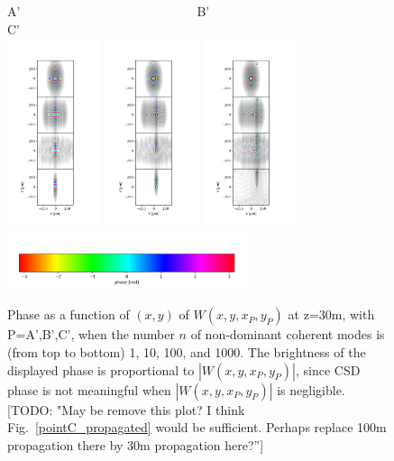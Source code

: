 \documentclass{iucr}              %
\newcommand{\todo}[1]{{\color{red}[TODO: "#1'']}}
\begin{document}
\begin{figure}
\caption{Phase as a function of $(x,y)$ of $W(x,y,x_P,y_P)$ at z=30m, with P=A',B',C', when the number $n$ of non-dominant coherent modes is (from top to bottom) 1, 10, 100, and 1000. The brightness of the displayed phase is proportional to $|W(x,y,x_P,y_P)|$, since CSD phase is not meaningful when $|W(x,y,x_P,y_P)|$ is negligible. \todo{May be remove this plot? I think Fig.~\ref{pointC_propagated} would be sufficient. Perhaps replace 100m propagation there by 30m propagation here?} }
A'~~~~~~~~~~~~~~~~~~~~~~~~~~~~B'~~~~~~~~~~~~~~~~~~~~~~~~~~~~C'\\
\includegraphics[width=2.75cm]{Figures/vx_id16a_A_propagated.png}
\includegraphics[width=2.75cm]{Figures/vx_id16a_B_propagated.png}
\includegraphics[width=2.75cm]{Figures/vx_id16a_C_propagated.png}
\includegraphics[width=7cm]{Figures/color_bar.png}
\label{points_propagated30}
\end{figure}
\end{document}
